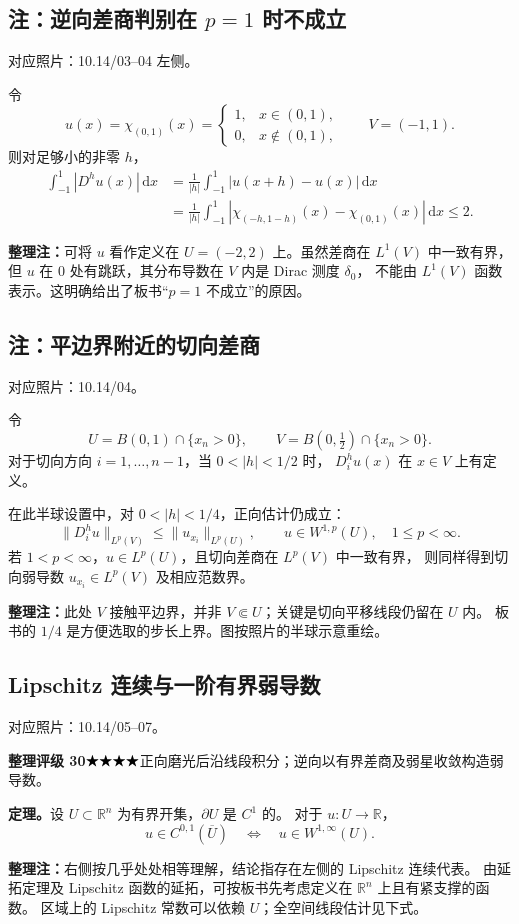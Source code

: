 \documentclass[UTF8,a4paper,11pt,fontset=fandol]{ctexart}
\newcommand{\R}{\mathbb R}
\newcommand{\dd}{\,\mathrm d}
\newcommand{\ednote}[1]{\par{\small\color{notegray}\textbf{整理注：}#1}\par}
\newcommand{\source}[1]{{\small\color{notegray}对应照片：#1。}\par}
\newcommand{\proofstars}[1]{\ensuremath{%
\ifnum#1>0\relax\bigstar\fi
\ifnum#1>1\relax\bigstar\fi
\ifnum#1>2\relax\bigstar\fi
\ifnum#1>3\relax\bigstar\fi
\ifnum#1>4\relax\bigstar\fi}}
\newcommand{\proofrating}[3]{\par{\small\color{proofblue}%
\textbf{整理评级 #1}\enspace\proofstars{#2}\quad #3\par}}
\begin{document}
\newpage
\subsection*{注：逆向差商判别在 $p=1$ 时不成立}
\source{10.14/03--04 左侧}
令
\[
u(x)=\chi_{(0,1)}(x)=
\begin{cases}
1,&x\in(0,1),\\
0,&x\notin(0,1),
\end{cases}
\qquad V=(-1,1).
\]
则对足够小的非零 $h$，
\[
\begin{aligned}
\int_{-1}^1|D^hu(x)|\dd x
&=\frac1{|h|}\int_{-1}^1|u(x+h)-u(x)|\dd x\\
&=\frac1{|h|}\int_{-1}^1
       |\chi_{(-h,1-h)}(x)-\chi_{(0,1)}(x)|\dd x
\leq2.
\end{aligned}
\]
\ednote{可将 $u$ 看作定义在 $U=(-2,2)$ 上。虽然差商在 $L^1(V)$ 中一致有界，
但 $u$ 在 $0$ 处有跳跃，其分布导数在 $V$ 内是 Dirac 测度 $\delta_0$，
不能由 $L^1(V)$ 函数表示。这明确给出了板书“$p=1$ 不成立”的原因。}

\subsection*{注：平边界附近的切向差商}
\source{10.14/04}
令
\[
U=B(0,1)\cap\{x_n>0\},\qquad
V=B(0,\tfrac12)\cap\{x_n>0\}.
\]
对于切向方向 $i=1,\ldots,n-1$，当 $0<|h|<1/2$ 时，
$D_i^hu(x)$ 在 $x\in V$ 上有定义。
\begin{center}
\end{center}
在此半球设置中，对 $0<|h|<1/4$，正向估计仍成立：
\[
\|D_i^hu\|_{L^p(V)}\leq\|u_{x_i}\|_{L^p(U)},
\qquad u\in W^{1,p}(U),\quad1\leq p<\infty.
\]
若 $1<p<\infty$，$u\in L^p(U)$，且切向差商在 $L^p(V)$ 中一致有界，
则同样得到切向弱导数 $u_{x_i}\in L^p(V)$ 及相应范数界。
\ednote{此处 $V$ 接触平边界，并非 $V\Subset U$；关键是切向平移线段仍留在 $U$ 内。
板书的 $1/4$ 是方便选取的步长上界。图按照片的半球示意重绘。}

\newpage
\subsection{Lipschitz 连续与一阶有界弱导数}
\source{10.14/05--07}
\proofrating{30}{4}{正向磨光后沿线段积分；逆向以有界差商及弱星收敛构造弱导数。}
\textbf{定理。}设 $U\subset\R^n$ 为有界开集，$\partial U$ 是 $C^1$ 的。
对于 $u:U\to\R$，
\[
\boxed{u\in C^{0,1}(\overline U)
\quad\Longleftrightarrow\quad u\in W^{1,\infty}(U).}
\]
\ednote{右侧按几乎处处相等理解，结论指存在左侧的 Lipschitz 连续代表。
由延拓定理及 Lipschitz 函数的延拓，可按板书先考虑定义在 $\R^n$ 上且有紧支撑的函数。
区域上的 Lipschitz 常数可以依赖 $U$；全空间线段估计见下式。}
\end{document}
